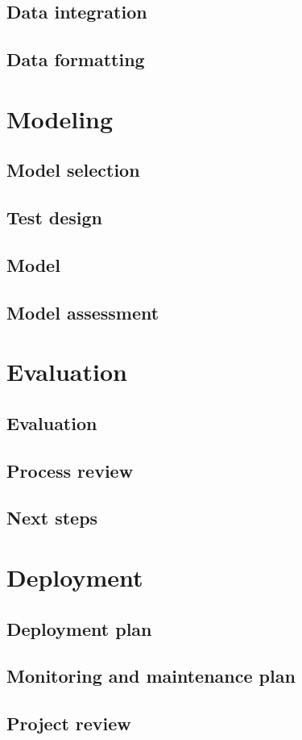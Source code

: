 \documentclass[12pt]{IEEEtran}
\begin{document}
\subsection{Data integration}
\subsection{Data formatting}

\section{Modeling}
\subsection{Model selection}
\subsection{Test design}
\subsection{Model}
\subsection{Model assessment}

\section{Evaluation}
\subsection{Evaluation}
\subsection{Process review}
\subsection{Next steps}

\section{Deployment}
\subsection{Deployment plan}
\subsection{Monitoring and maintenance plan}
\subsection{Project review}
\end{document}
